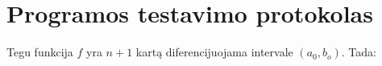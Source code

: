 \section{Programos testavimo protokolas}

Tegu funkcija $f$ yra $n+1$ kartą diferencijuojama intervale $(a_0,b_o)$.
Tada:

